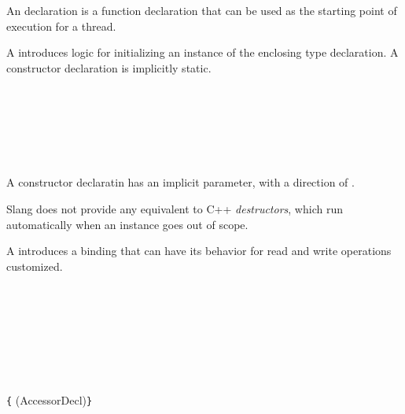 
An  declaration is a function declaration that can be used as the starting point of execution for a thread.


A  introduces logic for initializing an instance of the enclosing type declaration.
A constructor declaration is implicitly static.

\begin{Syntax}
     \\
         \\
        \SynOpt \\
         \\
         \\
\end{Syntax}

A constructor declaratin has an implicit  parameter, with a direction of .



\begin{Note}
Slang does not provide any equivalent to C++ \emph{destructors}, which run automatically when an instance goes out of scope.
\end{Note}


A  introduces a binding that can have its behavior for read and write operations customized.

\begin{Syntax}
     \\
         \\
        \SynOpt \\
         \\
         \\
         \\

     \\
        \lstinline|{| \SynRef(AccessorDecl)\SynStar \lstinline|}|
\end{Syntax}

